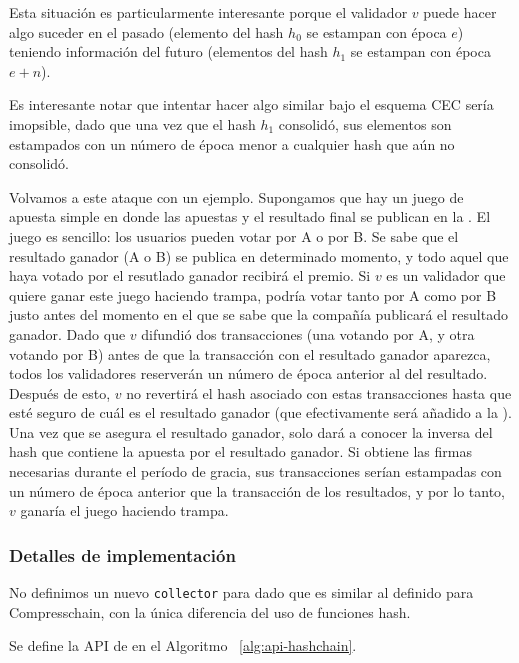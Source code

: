 Esta situación es particularmente interesante porque el validador $v$ puede hacer algo
suceder en el pasado (elemento del hash $h_0$ se estampan con época $e$) teniendo información
del futuro (elementos del hash $h_1$ se estampan con época $e+n$). 
%

Es interesante notar que intentar hacer algo similar bajo el esquema CEC sería imopsible, dado
que una vez que el hash $h_1$ consolidó, sus elementos son estampados con un número de época menor
a cualquier hash que aún no consolidó.
%

Volvamos a este ataque con un ejemplo. Supongamos que hay un juego de apuesta simple en donde
las apuestas y el resultado final se publican en la \hashchain. El juego es sencillo: los usuarios
pueden votar por A o por B. Se sabe que el resultado ganador (A o B) se publica en determinado momento,
y todo aquel que haya votado por el resutlado ganador recibirá el premio.
%
Si $v$ es un validador que quiere ganar este juego haciendo trampa, podría votar tanto por A
como por B justo antes del momento en el que se sabe que la compañía publicará el resultado ganador.
%
Dado que $v$ difundió dos transacciones (una votando por A, y otra votando por B) antes de que la
transacción con el resultado ganador aparezca, todos los validadores reserverán un número de época
anterior al del resultado. Después de esto, $v$ no revertirá el hash asociado con estas transacciones
hasta que esté seguro de cuál es el resultado ganador (que efectivamente será añadido a la \hashchain).
%
Una vez que se asegura el resultado ganador, solo dará a conocer la inversa del hash que contiene la apuesta
por el resultado ganador. Si obtiene las firmas necesarias durante el período de gracia,
sus transacciones serían estampadas con un número de época anterior que la transacción de los resultados,
y por lo tanto, $v$ ganaría el juego haciendo trampa.




\subsubsection{Detalles de implementación}\label{subsubsec:details}

No definimos un nuevo \texttt{collector} para \hashchain dado que es similar al definido
para Compresschain, con la única diferencia del uso de funciones hash.

Se define la API de \setchain en el Algoritmo ~\ref{alg:api-hashchain}.

